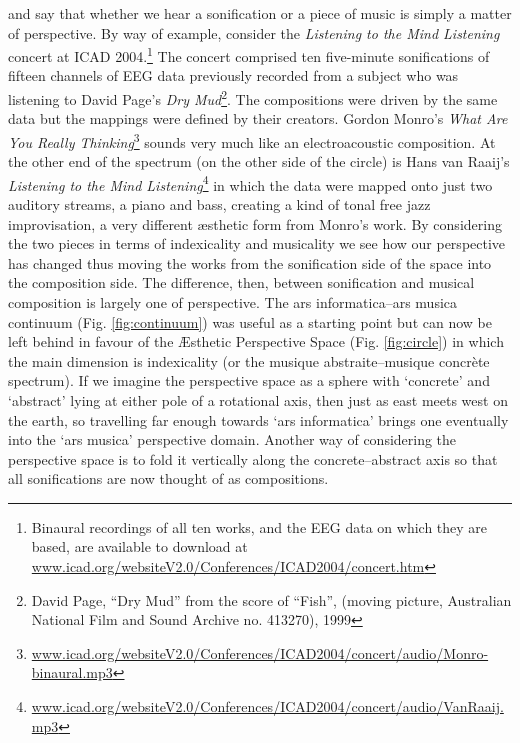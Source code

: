 \documentclass{article}
\begin{document}
and say that whether we hear a sonification or a piece of music is simply a matter of perspective. By way of example, consider the \textit{Listening to the Mind Listening} concert at ICAD 2004.\footnote{Binaural recordings of all ten works, and the EEG data on which they are based, are available to download at \url{www.icad.org/websiteV2.0/Conferences/ICAD2004/concert.htm}} The concert comprised ten five-minute sonifications of fifteen channels of EEG data previously recorded from a subject who was listening to David Page's \textit{Dry Mud}\footnote{David Page, ``Dry Mud'' from the score of ``Fish'', (moving picture, Australian National Film and Sound Archive no. 413270), 1999 }. The compositions were driven by the same data but the mappings were defined by their creators. Gordon Monro's \textit{What Are You Really Thinking}\footnote{\url{www.icad.org/websiteV2.0/Conferences/ICAD2004/concert/audio/Monro-binaural.mp3}} sounds very much like an electroacoustic composition. At the other end of the spectrum (on the other side of the circle) is Hans van Raaij's \textit{Listening to the Mind Listening}\footnote{\url{www.icad.org/websiteV2.0/Conferences/ICAD2004/concert/audio/VanRaaij.mp3}} in which the data were mapped onto just two auditory streams, a piano and bass, creating a kind of tonal free jazz improvisation, a very different æsthetic form from Monro's work. By considering the two pieces in terms of indexicality and musicality we see how our perspective has changed thus moving the works from the sonification side of the space into the composition side. The difference, then, between sonification and musical composition is largely one of perspective. The ars informatica--ars musica continuum (Fig. \ref{fig:continuum}) was useful as a starting point but can now be left behind in favour of the Æsthetic Perspective Space (Fig. \ref{fig:circle}) in which the main dimension is indexicality (or the musique abstraite--musique concrète spectrum). If we imagine the perspective space as a sphere with `concrete' and `abstract' lying at either pole of a rotational axis, then just as east meets west on the earth, so travelling far enough towards `ars informatica' brings one eventually into the `ars musica' perspective domain. Another way of considering the perspective space is to fold it vertically along the concrete--abstract axis so that all sonifications are now thought of as compositions.
\end{document}
